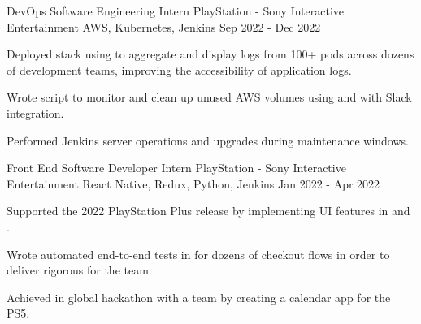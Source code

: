 

\begin{cventries}

  \cventry
    {DevOps Software Engineering Intern} %
    {PlayStation - Sony Interactive Entertainment} %
    {AWS, Kubernetes, Jenkins} %
    {Sep 2022 - Dec 2022} %
    {
      \begin{cvitems} %
        \item {Deployed  stack using  to aggregate and display logs from 100+  pods across dozens of development teams, improving the accessibility of application logs.}
        \item {Wrote script to monitor and clean up unused AWS volumes using  and  with Slack integration.}
        \item {Performed  Jenkins server operations and upgrades during maintenance windows.}
      \end{cvitems}
    }

  \cventry
    {Front End Software Developer Intern} %
    {PlayStation - Sony Interactive Entertainment} %
    {React Native, Redux, Python, Jenkins} %
    {Jan 2022 - Apr 2022} %
    {
      \begin{cvitems} %
        \item {Supported the 2022 PlayStation Plus release by implementing UI features in  and .}
        \item {Wrote automated end-to-end tests in  for dozens of checkout flows in order to deliver rigorous  for the team.} 
        \item {Achieved  in global hackathon with a team by creating a calendar app for the PS5.}
      \end{cvitems}
    }


\end{cventries}
